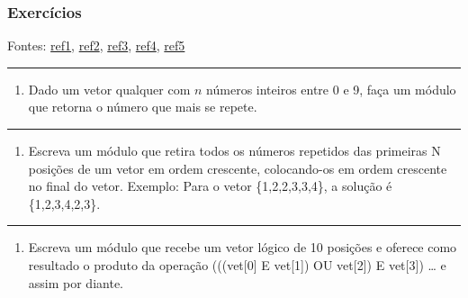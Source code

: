 \documentclass[12pt,a4paper]{article}
\providecommand{\tightlist}{%
      \setlength{\itemsep}{0pt}\setlength{\parskip}{0pt}}
\begin{document}
    \hypertarget{exercuxedcios}{%
\subsubsection{Exercícios}\label{exercuxedcios}}

Fontes:
\href{http://www.deinf.ufma.br/~csalles/prog/prog_lista2.pdf}{ref1},
\href{http://www.sistemas24horas.com.br/aulas/files_dic1/lista-exercicios-vetores-1.pdf}{ref2},
\href{https://fit.faccat.br/~fpereira/apostilas/exerc_resp_alg_mar2007.pdf}{ref3},
\href{https://docplayer.com.br/54457072-Laboratorio-de-programacao-a-exercicios-sobre-vetores-e-matrizes.html}{ref4},
\href{https://docplayer.com.br/21195395-Exercicios-vetores-e-matrizes.html}{ref5}

    \begin{center}\rule{0.5\linewidth}{0.5pt}\end{center}

\begin{enumerate}
\def\labelenumi{\arabic{enumi}.}
\tightlist
\item
  Dado um vetor qualquer com \(n\) números inteiros entre 0 e 9, faça um
  módulo que retorna o número que mais se repete.
\end{enumerate}

    \begin{center}\rule{0.5\linewidth}{0.5pt}\end{center}

\begin{enumerate}
\def\labelenumi{\arabic{enumi}.}
\setcounter{enumi}{1}
\tightlist
\item
  Escreva um módulo que retira todos os números repetidos das primeiras
  N posições de um vetor em ordem crescente, colocando-os em ordem
  crescente no final do vetor. Exemplo: Para o vetor \{1,2,2,3,3,4\}, a
  solução é \{1,2,3,4,2,3\}.
\end{enumerate}

    \begin{center}\rule{0.5\linewidth}{0.5pt}\end{center}

\begin{enumerate}
\def\labelenumi{\arabic{enumi}.}
\setcounter{enumi}{2}
\tightlist
\item
  Escreva um módulo que recebe um vetor lógico de 10 posições e oferece
  como resultado o produto da operação (((vet{[}0{]} E vet{[}1{]}) OU
  vet{[}2{]}) E vet{[}3{]}) \ldots{} e assim por diante.
\end{enumerate}
\end{document}
